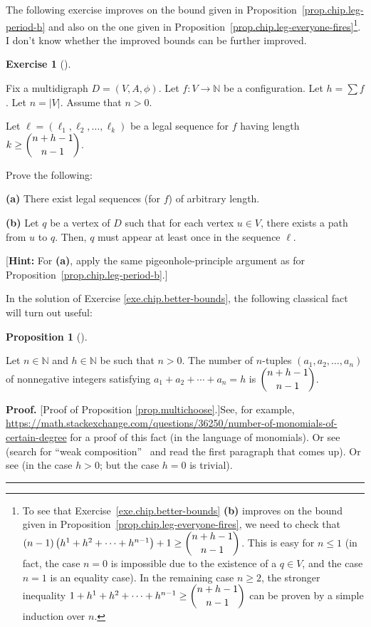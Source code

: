 \documentclass[numbers=enddot,12pt,final,onecolumn,notitlepage]{scrartcl}%
\newcounter{exer}
\theoremstyle{definition}
\newtheorem{prop}[theo]{Proposition}
\newenvironment{proposition}[1][]
{\begin{prop}[#1]\begin{leftbar}}
{\end{leftbar}\end{prop}}
\newtheorem{exmp}[exer]{Exercise}
\newenvironment{exercise}[1][]
{\begin{exmp}[#1]\begin{leftbar}}
{\end{leftbar}\end{exmp}}
\newenvironment{proof}[1][Proof]{\noindent\textbf{#1.} }{\ \rule{0.5em}{0.5em}}
\let\sumnonlimits\sum
\renewcommand{\sum}{\sumnonlimits\limits}
\newcommand{\NN}{\mathbb{N}}
\newcommand{\abs}[1]{\left| #1 \right|}
\newcommand{\tup}[1]{\left( #1 \right)}
\begin{document}
The following exercise improves on the bound given in
Proposition~\ref{prop.chip.leg-period-b} and
also on the one given in
Proposition~\ref{prop.chip.leg-everyone-fires}\footnote{To
  see that Exercise~\ref{exe.chip.better-bounds} \textbf{(b)}
  improves on the bound given in
  Proposition~\ref{prop.chip.leg-everyone-fires},
  we need to check that
  $\tup{n-1} \tup{ h^1 + h^2 + \cdots + h^{n-1} } + 1
  \geq \dbinom{n+h-1}{n-1}$.
  This is easy for $n \leq 1$ (in fact, the case
  $n = 0$ is impossible due to the existence of a
  $q \in V$, and the case $n = 1$ is an equality
  case).
  In the remaining case $n \geq 2$,
  the stronger inequality
  $1 + h^1 + h^2 + \cdots + h^{n-1}
  \geq \dbinom{n+h-1}{n-1}$
  can be proven by a simple induction
  over $n$.}.
I don't know whether the improved bounds can be further
improved.

\begin{exercise} \label{exe.chip.better-bounds}
Fix a multidigraph $D = \tup{V, A, \phi}$.
Let $f : V \to \NN$ be a configuration.
Let $h = \sum f$.
Let $n = \abs{V}$.
Assume that $n > 0$.

Let $\ell = \tup{\ell_1, \ell_2, \ldots, \ell_k}$ be a
legal sequence for $f$ having length
$k \geq \dbinom{n+h-1}{n-1}$.

Prove the following:

\textbf{(a)} There exist legal sequences (for $f$) of
arbitrary length.

\textbf{(b)} Let $q$ be a vertex of $D$ such that for each vertex
$u \in V$, there exists a path from $u$ to $q$.
Then, $q$ must appear at least once in the sequence $\ell$.

[\textbf{Hint:}
For \textbf{(a)}, apply the same pigeonhole-principle argument
as for Proposition~\ref{prop.chip.leg-period-b}.]
\end{exercise}

In the solution of Exercise \ref{exe.chip.better-bounds}, the following
classical fact will turn out useful:

\begin{proposition}
\label{prop.multichoose}Let $n\in\mathbb{N}$ and $h\in\mathbb{N}$ be such that
$n>0$. The number of $n$-tuples $\left(  a_{1},a_{2},\ldots,a_{n}\right)  $ of
nonnegative integers satisfying $a_{1}+a_{2}+\cdots+a_{n}=h$ is $\dbinom
{n+h-1}{n-1}$.
\end{proposition}

\begin{proof}
[Proof of Proposition \ref{prop.multichoose}.]See, for example,
\url{https://math.stackexchange.com/questions/36250/number-of-monomials-of-certain-degree}
for a proof of this fact (in the language of monomials). Or see \cite[\S 1.2]%
{Stanle11} (search for \textquotedblleft weak composition\textquotedblright%
\ and read the first paragraph that comes up).
Or see \cite[Proposition 13.3]{Galvin} (in the case $h > 0$; but the case
$h = 0$ is trivial).
\end{proof}
\end{document}
